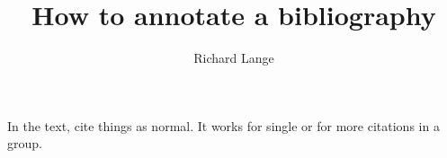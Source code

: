 \documentclass[11pt]{article}
\title{How to annotate a bibliography}
\author{Richard Lange}
\begin{document}

\maketitle

In the text, cite things as normal\cite{latexcompanion}. It works for single\cite{einstein} or for more\cite{knuthwebsite,latexcompanion} citations in a group.


\renewcommand{\refname}{References and recommended reading}






\null
\end{document}
